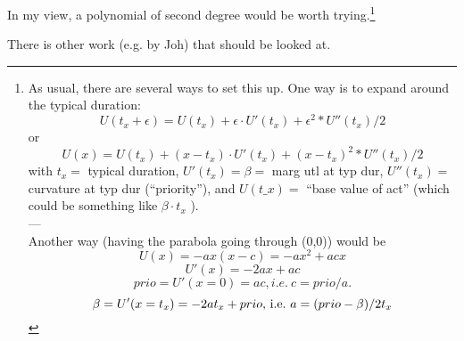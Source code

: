 In  my view, a polynomial of second degree would be worth trying.\footnote{%
%
As  usual,  there are several ways to set this up. One way is to  expand around the  typical duration:
\[
U(t_x + \epsilon) = U(t_x) + \epsilon \cdot U'(t_x) + \epsilon^2 * U''(t_x)/2
\]
or
\[
U(x) = U(t_x) + (x-t_x) \cdot U'(t_x) + (x-t_x)^2 * U''(t_x)/2
\]
with $t_x =$ typical duration, $U'(t_x) = \beta =$ marg utl at typ dur, $U''(t_x) =$  curvature at typ dur (``priority''), and $U(t\_x) =$ ``base value of act'' (which could be something like $\beta \cdot t_x$ ).
\\
---
\\
Another way (having the parabola going through (0,0)) would be
\[
U(x) = - a x ( x - c ) = - a x^2 + a c x
\]
\[
U'(x) = - 2 a x + a c
\]
\[
prio = U'(x=0) = a c , i.e.\ c = prio/a .
\]
\[
\beta = U'(x=t_x) = - 2 a t_x + prio \hbox{, i.e.\ } a = (prio - \beta)/2t_x
\]
}

There is other work (e.g. by Joh) that should be looked at.

